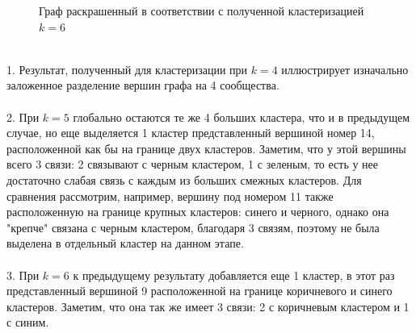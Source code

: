 \documentclass[a5paper, 10pt]{article}
\theoremstyle{definition}
\theoremstyle{plain}
\theoremstyle{remark}
\begin{document}
\begin{figure}[h!]
\caption{Граф раскрашенный в соответствии с полученной кластеризацией $k=6$}
\end{figure}
\\
1. Результат, полученный для кластеризации при $k=4$ иллюстрирует изначально заложенное разделение вершин графа на 4 сообщества.\\
\\2. При $k=5$ глобально остаются те же 4 больших кластера, что и в предыдущем случае, но еще выделяется 1 кластер представленный вершиной номер 14, расположенной как бы на границе двух кластеров. Заметим, что у этой вершины всего 3 связи: 2 связывают с черным кластером, 1 с зеленым, то есть у нее достаточно слабая связь с каждым из больших смежных кластеров. Для сравнения рассмотрим, например, вершину под номером 11 также расположенную на границе крупных кластеров: синего и черного, однако она "крепче" связана с черным кластером, благодаря 3 связям, поэтому не была выделена в отдельный кластер на данном этапе.\\
\\3. При $k=6$ к предыдущему результату добавляется еще 1 кластер, в этот раз представленный вершиной 9 расположенной на границе коричневого и синего кластеров. Заметим, что она так же имеет 3 связи: 2 с коричневым кластером и 1 с синим.\\
\\
\end{document}
